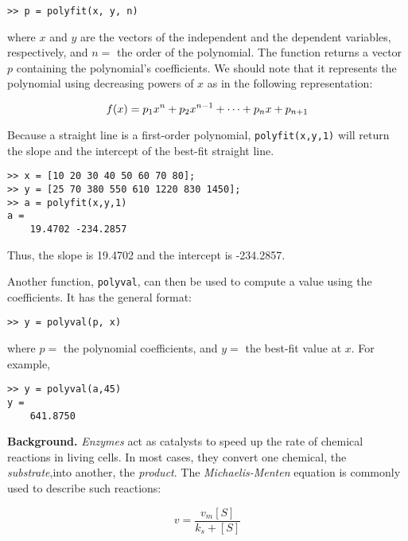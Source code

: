\documentclass[../main.tex]{subfiles}
\begin{document}
\begin{lstlisting}[numbers=none]
>> p = polyfit(x, y, n)
\end{lstlisting}

\noindent where $x$ and $y$ are the vectors of the independent and the dependent variables, respectively, and $n =$ the order of the polynomial. The function returns a vector $p$ containing the polynomial's coefficients. We should note that it represents the polynomial using decreasing powers of $x$ as in the following representation:

\begin{equation}
	\notag
	f(x) = p_1x^n + p_2x^{n-1} + \cdots + p_n x + p_{n + 1}
\end{equation}

Because a straight line is a first-order polynomial, \verb|polyfit(x,y,1)| will return the slope and the intercept of the best-fit straight line.

\begin{lstlisting}[numbers=none]
>> x = [10 20 30 40 50 60 70 80];
>> y = [25 70 380 550 610 1220 830 1450];
>> a = polyfit(x,y,1)
a =
	19.4702 -234.2857
\end{lstlisting}

\noindent Thus, the slope is 19.4702 and the intercept is -234.2857.

Another function, \texttt{polyval}, can then be used to compute a value using the coefficients. It has the general format:

\begin{lstlisting}[numbers=none]
>> y = polyval(p, x)
\end{lstlisting}

\noindent where $p =$ the polynomial coefficients, and $y =$ the best-fit value at $x$. For example,

\begin{lstlisting}[numbers=none]
>> y = polyval(a,45)
y =
	641.8750
\end{lstlisting}

\bigskip

\textbf{Background.} \textit{Enzymes} act as catalysts to speed up the rate of chemical reactions in living cells. In most cases, they convert one chemical, the \textit{substrate},into another, the \textit{product}. The \textit{Michaelis-Menten} equation is commonly used to describe such reactions:

\begin{equation}
	\tag{14.28}
	v = \frac{v_m[S]}{k_s + [S]}
\end{equation}
\end{document}
